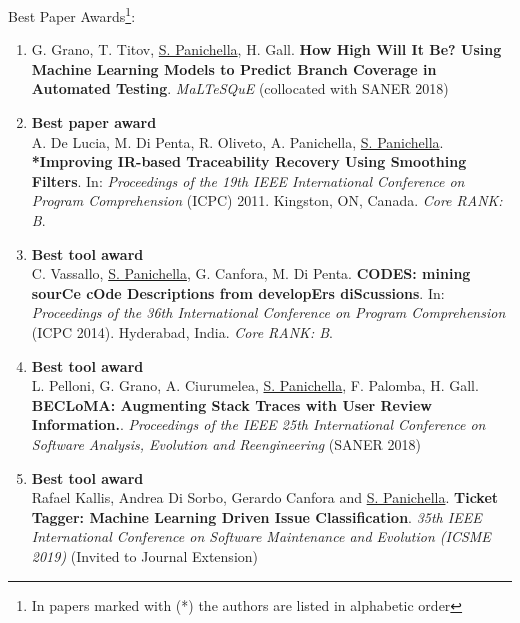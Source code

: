 \documentclass[10pt]{article}
\begin{document}
Best Paper Awards\footnote{
 In papers marked with (*)  the authors are listed in alphabetic order}: %
\begin{enumerate}
 
 \item  G. Grano, T. Titov, \underline{S. Panichella}, H. Gall. \textbf{How High Will It Be? Using Machine Learning Models to Predict Branch Coverage in Automated Testing}.  \emph{MaLTeSQuE}  (collocated with SANER 2018) 
 
\item \textbf{Best paper award}\\
A. De Lucia, M. Di Penta, R. Oliveto, A. Panichella, \underline{S. Panichella}. \textbf{*Improving IR-based Traceability Recovery Using Smoothing Filters}. In: \emph{Proceedings of the 19th IEEE International Conference on Program Comprehension} (ICPC) 2011. Kingston, ON, Canada.  \textit{Core RANK: B}.
\item \textbf{Best tool award}\\
 C. Vassallo, \underline{S. Panichella}, G. Canfora, M. Di Penta. \textbf{CODES: mining sourCe cOde Descriptions from developErs diScussions}. In: \emph{Proceedings of the 36th International Conference on Program Comprehension} (ICPC 2014). Hyderabad, India.  \textit{Core RANK: B}.
 \item \textbf{Best tool award}\\
 L. Pelloni, G. Grano, A. Ciurumelea, \underline{S. Panichella}, F. Palomba, H. Gall. \textbf{BECLoMA: Augmenting Stack Traces with User Review Information.}.  \emph{Proceedings of the  {IEEE} 25th International Conference on Software Analysis, Evolution and Reengineering}  (SANER 2018)
 \item  \textbf{Best tool award}\\Rafael Kallis, Andrea Di Sorbo, Gerardo Canfora and \underline{S. Panichella}. \textbf{Ticket Tagger: Machine Learning Driven Issue Classification}.  \emph{35th IEEE International Conference on Software Maintenance and Evolution (ICSME 2019)}  (Invited to Journal Extension) 
\end{enumerate}
\end{document}

